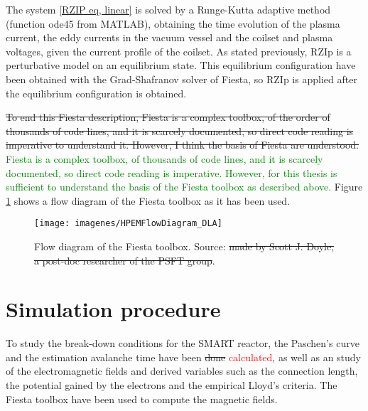 \documentclass[a4paper,12pt,oneside]{book}
\begin{document}
The system \eqref{RZIP eq, linear} is solved by a Runge-Kutta adaptive method (function ode45 from MATLAB), obtaining the time evolution of the plasma current, the eddy currents in the vacuum vessel and the coilset and plasma voltages, given the current profile of the coilset. As stated previously, RZIp is a perturbative model on an equilibrium state. This equilibrium configuration have been obtained with the Grad-Shafranov solver of Fiesta, so RZIp is applied after the equilibrium configuration is obtained.

\st{To end this Fiesta description, Fiesta is a complex toolbox, of the order of thousands of code lines, and it is scarcely documented, so direct code reading is imperative to understand it. However, I think the basis of Fiesta are understood.} \textcolor{green}{Fiesta is a complex toolbox, of thousands of code lines, and it is scarcely documented, so direct code reading is imperative. However, for this thesis is sufficient to understand the basis of the Fiesta toolbox as described above.} Figure \ref{fig_diagram_Fiesta} shows a flow diagram of the Fiesta toolbox as it has been used.


\begin{figure}[htbp]
\centering
\texttt{[image: imagenes/HPEMFlowDiagram\_DLA]}
\caption{Flow diagram of the Fiesta toolbox. Source: \cite{Scott} \st{made by Scott J. Doyle, a post-doc researcher of the PSFT group}.}
\label{fig_diagram_Fiesta}
\end{figure}


\chapter{Simulation procedure}
\label{chapter_simu}

To study the break-down conditions for the SMART reactor, the Paschen's curve and the estimation avalanche time have been \st{done} \textcolor{red}{calculated}, as well as an study of the electromagnetic fields and derived variables such as the connection length, the potential gained by the electrons and the empirical Lloyd's criteria. The Fiesta toolbox have been used to compute the magnetic fields.
\end{document}
